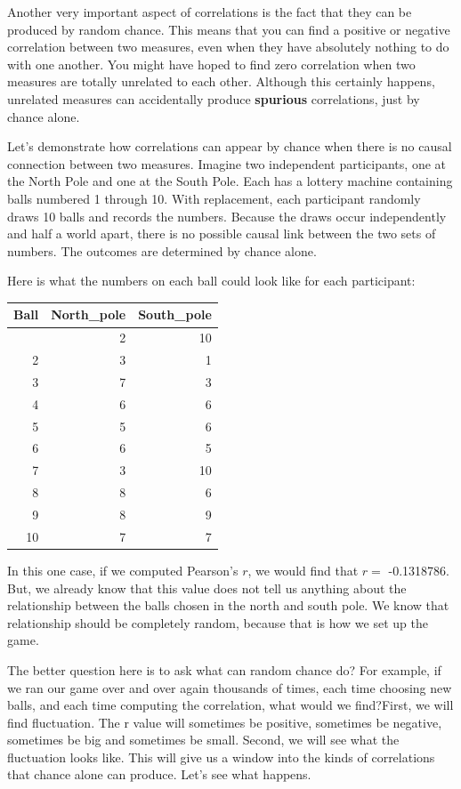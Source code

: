 \documentclass[
  letterpaper,
  DIV=11,
  numbers=noendperiod]{scrreprt}
\begin{document}
Another very important aspect of correlations is the fact that they can
be produced by random chance. This means that you can find a positive or
negative correlation between two measures, even when they have
absolutely nothing to do with one another. You might have hoped to find
zero correlation when two measures are totally unrelated to each other.
Although this certainly happens, unrelated measures can accidentally
produce \textbf{spurious} correlations, just by chance alone.

Let's demonstrate how correlations can appear by chance when there is no
causal connection between two measures. Imagine two independent
participants, one at the North Pole and one at the South Pole. Each has
a lottery machine containing balls numbered 1 through 10. With
replacement, each participant randomly draws 10 balls and records the
numbers. Because the draws occur independently and half a world apart,
there is no possible causal link between the two sets of numbers. The
outcomes are determined by chance alone.

Here is what the numbers on each ball could look like for each
participant:

\begin{longtable}[]{@{}rrr@{}}
\toprule\noalign{}
Ball & North\_pole & South\_pole \\
\midrule\noalign{}
\endhead
\bottomrule\noalign{}
\endlastfoot
1 & 2 & 10 \\
2 & 3 & 1 \\
3 & 7 & 3 \\
4 & 6 & 6 \\
5 & 5 & 6 \\
6 & 6 & 5 \\
7 & 3 & 10 \\
8 & 8 & 6 \\
9 & 8 & 9 \\
10 & 7 & 7 \\
\end{longtable}

In this one case, if we computed Pearson's \(r\), we would find that
\(r =\) -0.1318786. But, we already know that this value does not tell
us anything about the relationship between the balls chosen in the north
and south pole. We know that relationship should be completely random,
because that is how we set up the game.

The better question here is to ask what can random chance do? For
example, if we ran our game over and over again thousands of times, each
time choosing new balls, and each time computing the correlation, what
would we find?First, we will find fluctuation. The r value will
sometimes be positive, sometimes be negative, sometimes be big and
sometimes be small. Second, we will see what the fluctuation looks like.
This will give us a window into the kinds of correlations that chance
alone can produce. Let's see what happens.
\end{document}
